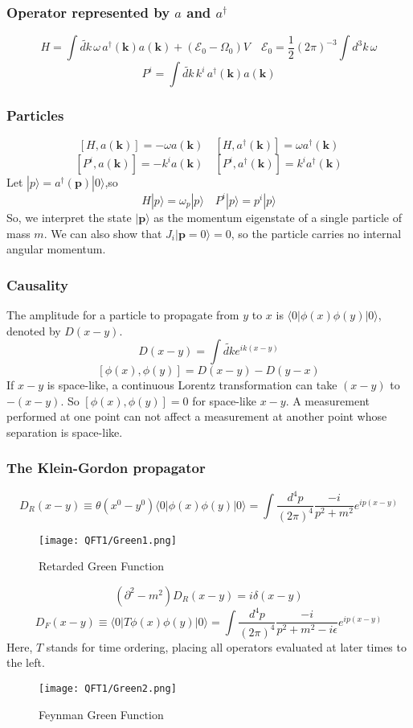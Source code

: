 \subsubsection{Operator represented by $a$ and $a^{\dagger}$}
\[H=\int \widetilde{dk}\, \omega\, a^{\dagger}(\bm{k})a(\bm{k}) + (\mathcal{E}_0 - \Omega_0)V \quad \mathcal{E}_0 = \frac{1}{2}(2\pi)^{-3}\int d^3 k \,\omega\]
\[P^{i}=\int \widetilde{dk}\, k^{i}\, a^{\dagger}(\bm{k})a(\bm{k}) \]
\subsubsection{Particles}
\[[H,a(\bm{k})] = -\omega a(\bm{k}) \quad [H,a^{\dagger}(\bm{k})] = \omega a^{\dagger}(\bm{k})\]
\[[P^i,a(\bm{k})] = -k^i a(\bm{k}) \quad [P^i,a^{\dagger}(\bm{k})] = k^i a^{\dagger}(\bm{k})\]
Let $|p\rangle = a^{\dagger}(\bm{p})|0\rangle $,so
\[H |p\rangle = \omega_p|p\rangle \quad P^i |p\rangle = p^i|p\rangle\]
So, we interpret the state $|\bm{p}\rangle$ as the momentum eigenstate of a single particle of mass $m$. We can also show that 
$J_i|\bm{p} = 0\rangle = 0$, so the particle carries no internal angular momentum.
\subsubsection{Causality}
\noindent
The amplitude for a particle to propagate from $y$ to $x$ is $\langle 0 | \phi(x) \phi(y) | 0 \rangle$, denoted by $D(x-y)$.
\[D(x-y) = \int \widetilde{dk} e^{ik(x-y)}\]
\[[\phi(x),\phi(y)] = D(x-y) -D(y-x)\]
If $x-y$ is space-like, a continuous Lorentz transformation can take $(x-y)$ to $-(x-y)$. So $[\phi(x),\phi(y)] =0$ for space-like $x-y$. A measurement performed at one point can not affect a measurement at another point whose separation is space-like.
\subsubsection{The Klein-Gordon propagator}
\[D_R(x-y) \equiv \theta(x^0-y^0) \langle 0 | \phi(x) \phi(y) | 0 \rangle = \int \frac{d^4 p}{(2\pi)^4} \frac{-i}{p^2+m^2} e^{ip(x-y)}\]
\begin{figure}[!h]
\centering
\texttt{[image: QFT1/Green1.png]}
\caption{Retarded Green Function}
\end{figure}
\[(\partial^2-m^2) D_R(x-y) = i \delta(x-y)\]
\[D_F(x-y) \equiv \langle 0 | T\phi(x) \phi(y) | 0 \rangle = \int \frac{d^4 p}{(2\pi)^4} \frac{-i}{p^2+m^2-i\epsilon} e^{ip(x-y)}\]
Here, $T$ stands for time ordering, placing all operators evaluated at later times to the left.
\begin{figure}[!h]
\centering
\texttt{[image: QFT1/Green2.png]}
\caption{Feynman Green Function}
\end{figure}

